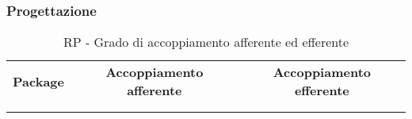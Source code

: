 \documentclass[../PianoDiQualifica.tex]{subfiles}
\begin{document}
			\subsubsection{Progettazione}
				\begin{table}[H]
				\center
				\begin{tabular}{!{\VRule[1.4pt]}l!{\VRule}c!{\VRule}c!{\VRule[1.4pt]}}
					\textbf{Package} & \textbf{Accoppiamento afferente} & \textbf{Accoppiamento efferente} \\
					 &  &  \\ \hline

				\end{tabular}
				\caption{RP - Grado di accoppiamento afferente ed efferente}
				\end{table}
\end{document}
